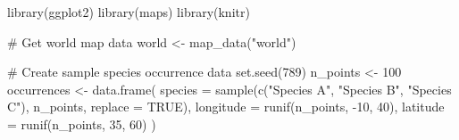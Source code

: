\documentclass[
  letterpaper,
]{book}
\newenvironment{Shaded}{\begin{snugshade}}{\end{snugshade}}
\newcommand{\AttributeTok}[1]{\textcolor[rgb]{0.40,0.45,0.13}{#1}}
\newcommand{\CommentTok}[1]{\textcolor[rgb]{0.37,0.37,0.37}{#1}}
\newcommand{\ConstantTok}[1]{\textcolor[rgb]{0.56,0.35,0.01}{#1}}
\newcommand{\DecValTok}[1]{\textcolor[rgb]{0.68,0.00,0.00}{#1}}
\newcommand{\FunctionTok}[1]{\textcolor[rgb]{0.28,0.35,0.67}{#1}}
\newcommand{\NormalTok}[1]{\textcolor[rgb]{0.00,0.23,0.31}{#1}}
\newcommand{\OtherTok}[1]{\textcolor[rgb]{0.00,0.23,0.31}{#1}}
\newcommand{\SpecialCharTok}[1]{\textcolor[rgb]{0.37,0.37,0.37}{#1}}
\newcommand{\StringTok}[1]{\textcolor[rgb]{0.13,0.47,0.30}{#1}}
\begin{document}
\begin{Shaded}
\begin{Highlighting}[]
\FunctionTok{library}\NormalTok{(ggplot2)}
\FunctionTok{library}\NormalTok{(maps)}
\FunctionTok{library}\NormalTok{(knitr)}

\CommentTok{\# Get world map data}
\NormalTok{world }\OtherTok{\textless{}{-}} \FunctionTok{map\_data}\NormalTok{(}\StringTok{"world"}\NormalTok{)}

\CommentTok{\# Create sample species occurrence data}
\FunctionTok{set.seed}\NormalTok{(}\DecValTok{789}\NormalTok{)}
\NormalTok{n\_points }\OtherTok{\textless{}{-}} \DecValTok{100}
\NormalTok{occurrences }\OtherTok{\textless{}{-}} \FunctionTok{data.frame}\NormalTok{(}
  \AttributeTok{species =} \FunctionTok{sample}\NormalTok{(}\FunctionTok{c}\NormalTok{(}\StringTok{"Species A"}\NormalTok{, }\StringTok{"Species B"}\NormalTok{, }\StringTok{"Species C"}\NormalTok{), n\_points, }\AttributeTok{replace =} \ConstantTok{TRUE}\NormalTok{),}
  \AttributeTok{longitude =} \FunctionTok{runif}\NormalTok{(n\_points, }\SpecialCharTok{{-}}\DecValTok{10}\NormalTok{, }\DecValTok{40}\NormalTok{),}
  \AttributeTok{latitude =} \FunctionTok{runif}\NormalTok{(n\_points, }\DecValTok{35}\NormalTok{, }\DecValTok{60}\NormalTok{)}
\NormalTok{)}


\end{Highlighting}
\end{Shaded}
\end{document}
